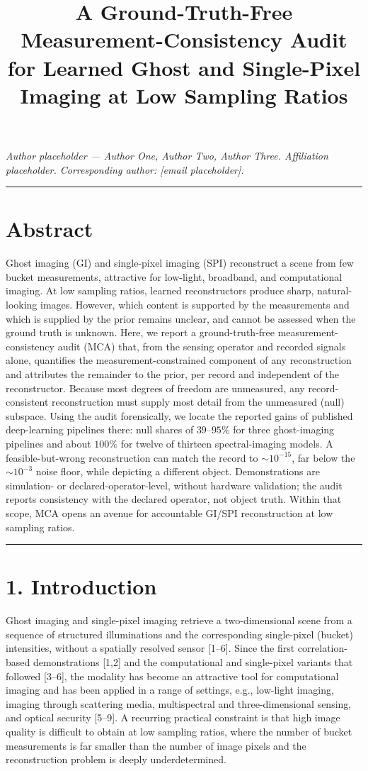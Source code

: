\documentclass[11pt]{article}
\title{A Ground-Truth-Free Measurement-Consistency Audit for Learned Ghost and Single-Pixel Imaging at Low Sampling Ratios}
\author{}\date{}
\begin{document}
\maketitle

\textit{Author placeholder --- Author One, Author Two, Author Three. Affiliation placeholder. Corresponding author: [email placeholder].}

\medskip\hrule\medskip

\section*{Abstract}

Ghost imaging (GI) and single-pixel imaging (SPI) reconstruct a scene from few bucket measurements, attractive for low-light, broadband, and computational imaging. At low sampling ratios, learned reconstructors produce sharp, natural-looking images. However, which content is supported by the measurements and which is supplied by the prior remains unclear, and cannot be assessed when the ground truth is unknown. Here, we report a ground-truth-free measurement-consistency audit (MCA) that, from the sensing operator and recorded signals alone, quantifies the measurement-constrained component of any reconstruction and attributes the remainder to the prior, per record and independent of the reconstructor. Because most degrees of freedom are unmeasured, any record-consistent reconstruction must supply most detail from the unmeasured (null) subspace. Using the audit forensically, we locate the reported gains of published deep-learning pipelines there: null shares of $39$--$95\%$ for three ghost-imaging pipelines and about $100\%$ for twelve of thirteen spectral-imaging models. A feasible-but-wrong reconstruction can match the record to ${\sim}10^{-15}$, far below the ${\sim}10^{-3}$ noise floor, while depicting a different object. Demonstrations are simulation- or declared-operator-level, without hardware validation; the audit reports consistency with the declared operator, not object truth. Within that scope, MCA opens an avenue for accountable GI/SPI reconstruction at low sampling ratios.

\medskip\hrule\medskip

\section*{1. Introduction}

Ghost imaging and single-pixel imaging retrieve a two-dimensional scene from a sequence of structured illuminations and the corresponding single-pixel (bucket) intensities, without a spatially resolved sensor [1--6]. Since the first correlation-based demonstrations [1,2] and the computational and single-pixel variants that followed [3--6], the modality has become an attractive tool for computational imaging and has been applied in a range of settings, e.g., low-light imaging, imaging through scattering media, multispectral and three-dimensional sensing, and optical security [5--9]. A recurring practical constraint is that high image quality is difficult to obtain at low sampling ratios, where the number of bucket measurements is far smaller than the number of image pixels and the reconstruction problem is deeply underdetermined.
\end{document}
